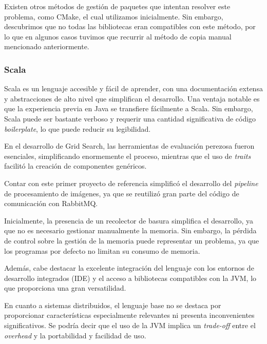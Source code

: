\documentclass[11pt]{article}
\let\Oldsubsubsection\subsubsection
\renewcommand{\subsubsection}{\FloatBarrier\Oldsubsubsection}
\newcommand{\english}[1]{\textit{#1}}
\begin{document}
Existen otros métodos de gestión de paquetes que intentan resolver este problema, como CMake, el cual utilizamos inicialmente. Sin embargo, descubrimos que no todas las bibliotecas eran compatibles con este método, por lo que en algunos casos tuvimos que recurrir al método de copia manual mencionado anteriormente.


\subsubsection{Scala}


Scala es un lenguaje accesible y fácil de aprender, con una documentación extensa y abstracciones de alto nivel que simplifican el desarrollo. Una ventaja notable es que la experiencia previa en Java se transfiere fácilmente a Scala. Sin embargo, Scala puede ser bastante verboso y requerir una cantidad significativa de código \english{boilerplate}, lo que puede reducir su legibilidad.

En el desarrollo de Grid Search, las herramientas de evaluación perezosa fueron esenciales, simplificando enormemente el proceso, mientras que el uso de \textit{traits} facilitó la creación de componentes genéricos.

Contar con este primer proyecto de referencia simplificó el desarrollo del \english{pipeline} de procesamiento de imágenes, ya que se reutilizó gran parte del código de comunicación con RabbitMQ.

Inicialmente, la presencia de un recolector de basura simplifica el desarrollo, ya que no es necesario gestionar manualmente la memoria. Sin embargo, la pérdida de control sobre la gestión de la memoria puede representar un problema, ya que los programas por defecto no limitan su consumo de memoria.

Además, cabe destacar la excelente integración del lenguaje con los entornos de desarrollo integrados (IDE) y el acceso a bibliotecas compatibles con la JVM, lo que proporciona una gran versatilidad.

En cuanto a sistemas distribuidos, el lenguaje base no se destaca por proporcionar características especialmente relevantes ni presenta inconvenientes significativos. Se podría decir que el uso de la JVM implica un \textit{trade-off} entre el \textit{overhead} y la portabilidad y facilidad de uso.
\end{document}
